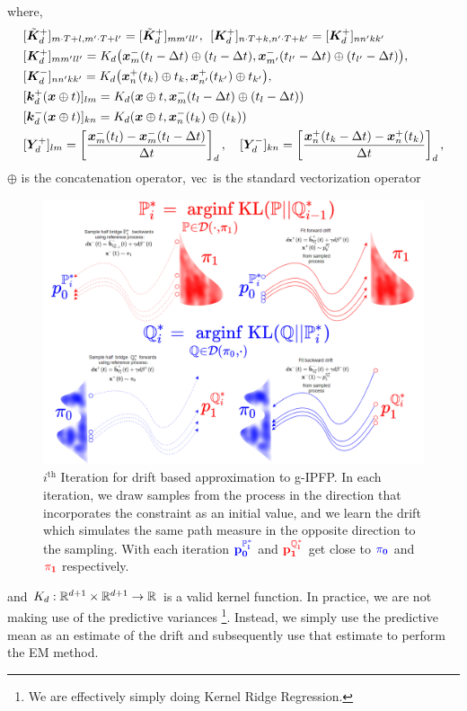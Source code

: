 \documentclass[a4paper,12pt,twoside,openright]{report}
\theoremstyle{definition}
\begin{document}
where,
\begin{align*}
   & [ \tilde{\mK}_d^{+} ]_{m\cdot T+l,m'\cdot T+l'} = [ \tilde{\mK}_d^{+} ]_{mm'll'}, \:\:  [ \mK_d^{+} ]_{n\cdot T+k,n' \cdot T +k'} = [ \mK_d^{+} ]_{nn'kk'}\\
   &[ \mK_d^{+} ]_{mm'll'} = {K}_d\big(\vx^{-}_m(t_l- \Delta t)\oplus (t_l - \Delta t), \vx^{-}_{m'}(t_{l'} - \Delta t)\oplus ( t_{l'} - \Delta t) \big), \\
   &[ \mK_d^{-} ]_{nn'kk'} = {K}_d\big(\vx^{+}_n(t_k) \oplus t_k , \vx^{+}_{n'}(t_{k'})\oplus t_{k'} \big),  \\
   &[\vk_d^{+}(\vx \oplus t)]_{lm} = K_d(\vx \oplus t , \vx^{-}_m(t_l- \Delta t)\oplus (t_l - \Delta t))\\
   &[\vk_d^{-}(\vx \oplus t)]_{kn} = K_d(\vx \oplus t , \vx^{-}_n(t_k)\oplus (t_k))\\
   &[\mY_d^{+}]_{lm} =  \left[\frac{\vx^{-}_m(t_l) - \vx^{-}_m(t_l - \Delta t)}{\Delta t}\right]_d, \quad [\mY_d^{-}]_{kn} =  \left[\frac{\vx^{+}_n(t_k - \Delta t)  - \vx^{+}_n(t_k)}{\Delta t} \right]_d,
\end{align*}
 $\oplus$ is the concatenation operator, $\vec$ is the standard vectorization operator 
\begin{landscape}
\begin{figure}
    \vspace{-2cm}
    \includegraphics[scale=0.7]{images/gp_IPFP.PNG}
    \caption{$i^{\text{th}}$ Iteration for drift based approximation to g-IPFP. In each iteration, we draw samples from the process in the direction that incorporates the constraint as an initial value, and we learn the drift which simulates the same path measure in the opposite direction to the sampling. With each iteration $\mathbf{\color{blue}{p^{\P^{*}_i}_0}}$ and $\mathbf{\color{red}{p^{\Q^{*}_i}_1}}$ get close to $\mathbf{\color{blue}{\pi_0}}$ and $\mathbf{\color{red}{\pi_1}}$ respectively.}
    \label{fig:gp_drift}
\end{figure}
\end{landscape}
and $K_d: \R^{d+1} \times \R^{d+1} \rightarrow \R$ is a valid kernel function. In practice, we are not making use of the predictive variances \footnote{We are effectively simply doing Kernel Ridge Regression.}. Instead, we simply use the predictive mean as an estimate of the drift and subsequently use that estimate to perform the EM method.
\end{document}
